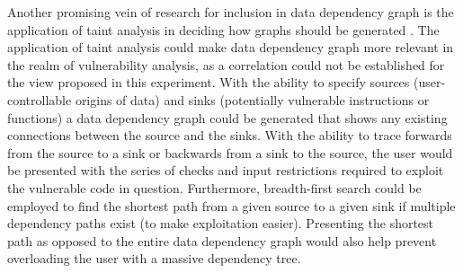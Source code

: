 Another promising vein of research for inclusion in data dependency graph is the application of taint analysis in deciding how graphs should be generated \citep{clause2007dytan, newsome2005dynamic, zhu2015dytaint}. The application of taint analysis could make data dependency graph more relevant in the realm of vulnerability analysis, as a correlation could not be established for the view proposed in this experiment. With the ability to specify sources (user-controllable origins of data) and sinks (potentially vulnerable instructions or functions) a data dependency graph could be generated that shows any existing connections between the source and the sinks. With the ability to trace forwards from the source to a sink or backwards from a sink to the source, the user would be presented with the series of checks and input restrictions required to exploit the vulnerable code in question. Furthermore, breadth-first search could be employed to find the shortest path from a given source to a given sink if multiple dependency paths exist (to make exploitation easier). Presenting the shortest path as opposed to the entire data dependency graph would also help prevent overloading the user with a massive dependency tree.